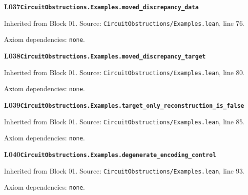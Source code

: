 \begin{minipage}{\linewidth}
\hypertarget{L037}{}
{\small\sffamily\bfseries\color{ink}L037\quad\nolinkurl{CircuitObstructions.Examples.moved_discrepancy_data}}\par
{\scriptsize\sffamily\color{muted}Inherited from Block 01. Source: \nolinkurl{CircuitObstructions/Examples.lean}, line 76.}\par
{}
{\scriptsize\sffamily\color{muted}Axiom dependencies: \nolinkurl{none}.}
\end{minipage}\par\medskip
\begin{minipage}{\linewidth}
\hypertarget{L038}{}
{\small\sffamily\bfseries\color{ink}L038\quad\nolinkurl{CircuitObstructions.Examples.moved_discrepancy_target}}\par
{\scriptsize\sffamily\color{muted}Inherited from Block 01. Source: \nolinkurl{CircuitObstructions/Examples.lean}, line 80.}\par
{}
{\scriptsize\sffamily\color{muted}Axiom dependencies: \nolinkurl{none}.}
\end{minipage}\par\medskip
\begin{minipage}{\linewidth}
\hypertarget{L039}{}
{\small\sffamily\bfseries\color{ink}L039\quad\nolinkurl{CircuitObstructions.Examples.target_only_reconstruction_is_false}}\par
{\scriptsize\sffamily\color{muted}Inherited from Block 01. Source: \nolinkurl{CircuitObstructions/Examples.lean}, line 85.}\par
{}
{\scriptsize\sffamily\color{muted}Axiom dependencies: \nolinkurl{none}.}
\end{minipage}\par\medskip
\begin{minipage}{\linewidth}
\hypertarget{L040}{}
{\small\sffamily\bfseries\color{ink}L040\quad\nolinkurl{CircuitObstructions.Examples.degenerate_encoding_control}}\par
{\scriptsize\sffamily\color{muted}Inherited from Block 01. Source: \nolinkurl{CircuitObstructions/Examples.lean}, line 93.}\par
{}
{\scriptsize\sffamily\color{muted}Axiom dependencies: \nolinkurl{none}.}
\end{minipage}\par\medskip

